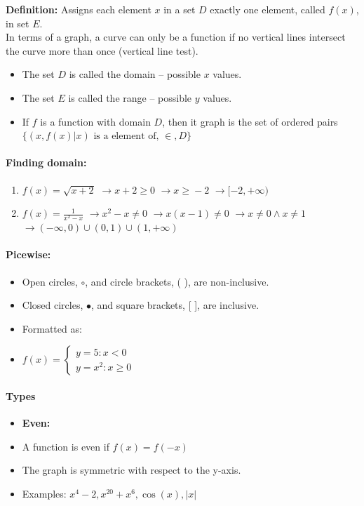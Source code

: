 \documentclass[12pt]{article}
\begin{document}
\textbf{Definition: }
Assigns each element $x$ in a set $D$ exactly one element, called $f(x)$, in set $E$.\\
In terms of a graph, a curve can only be a function if no vertical lines intersect the curve more than once (vertical line test).
\begin{itemize}
    \item The set $D$ is called the domain -- possible $x$ values.
    \item The set $E$ is called the range -- possible $y$ values.
    \item If $f$ is a function with domain $D$, then it graph is the set of ordered pairs\\
    $ \{(x, f(x) | x) \text{ is a element of, } \in{}, D\}$
\end{itemize}
\paragraph{Finding domain:}
\begin{enumerate}
    \item $f(x) = \sqrt{x+2}$
    $\rightarrow{} x + 2 \geq{} 0$
    $\rightarrow{} x \geq{} -2 $
    $\rightarrow{} [-2, +\infty)$
    
    \item $f(x) = \frac{1}{x^2-x} $
    $\rightarrow{} x^2-x \neq{} 0 $
    $\rightarrow{} x(x-1) \neq{} 0 $
    $\rightarrow{} x \neq{} 0 \wedge x \neq 1 $
    $\rightarrow{} (-\infty, 0) \cup (0, 1) \cup (1, +\infty)$
\end{enumerate}

\paragraph{Picewise:}
\begin{itemize}
    \item Open circles, $\circ$, and circle brackets, ( ), are non-inclusive.
    \item Closed circles, $\bullet$, and square brackets, [ ], are inclusive.
    \item Formatted as: 
    \item[] $f(x)=\begin{cases} 
              y=5   : x < 0 \\
              y=x^2 : x\geq 0 
            \end{cases}$
\end{itemize}

\paragraph{Types}
\begin{itemize}
    \item[] \textbf{Even: }
    \item A function is even if $f(x) = f(-x)$
    \item The graph is symmetric with respect to the y-axis.
    \item Examples: $x^4 - 2, x^{20}+x^6, \cos(x), |x|$

\end{itemize}
\end{document}
